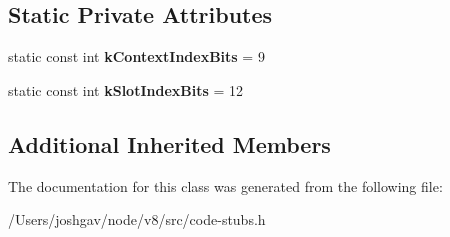 \subsection*{Static Private Attributes}
\begin{DoxyCompactItemize}
\item 
static const int {\bfseries k\+Context\+Index\+Bits} = 9\hypertarget{classv8_1_1internal_1_1_script_context_field_stub_ab3f37c7660fb96b313877ce98ab38979}{}\label{classv8_1_1internal_1_1_script_context_field_stub_ab3f37c7660fb96b313877ce98ab38979}

\item 
static const int {\bfseries k\+Slot\+Index\+Bits} = 12\hypertarget{classv8_1_1internal_1_1_script_context_field_stub_aed700e7a1daf7fb360a70a486576f2a4}{}\label{classv8_1_1internal_1_1_script_context_field_stub_aed700e7a1daf7fb360a70a486576f2a4}

\end{DoxyCompactItemize}
\subsection*{Additional Inherited Members}


The documentation for this class was generated from the following file\+:\begin{DoxyCompactItemize}
\item 
/\+Users/joshgav/node/v8/src/code-\/stubs.\+h\end{DoxyCompactItemize}

